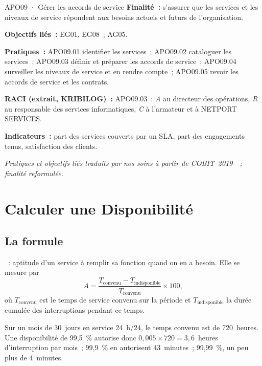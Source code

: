 \begin{boxobjet}{APO09 · Gérer les accords de service}
\textbf{Finalité~:} s'assurer que les services et les niveaux de service
répondent aux besoins actuels et futurs de l'organisation.

\textbf{Objectifs liés~:} EG01, EG08~; AG05.

\textbf{Pratiques~:} APO09.01 identifier les services~; APO09.02
cataloguer les services~; APO09.03 définir et préparer les accords de
service~; APO09.04 surveiller les niveaux de service et en rendre
compte~; APO09.05 revoir les accords de service et les contrats.

\textbf{RACI (extrait, KRIBILOG)~:} APO09.03~: \emph{A} au directeur des
opérations, \emph{R} au responsable des services informatiques, \emph{C}
à l'armateur et à NETPORT SERVICES.

\textbf{Indicateurs~:} part des services couverts par un SLA, part des
engagements tenus, satisfaction des clients.
\end{boxobjet}
{\small\itshape Pratiques et objectifs liés traduits par nos soins à partir
de COBIT~2019~\cite{isaca2018cobitobjectifs}~; finalité reformulée.}

\section{Calculer une Disponibilité}
\label{sec:c15-dispo}

\subsection{La formule}

\begin{boxdef}
~: aptitude d'un service à
remplir sa fonction quand on en a besoin. Elle se mesure par
\[
    A = \frac{T_{\text{convenu}} - T_{\text{indisponible}}}{T_{\text{convenu}}}
    \times 100,
\]
où $T_{\text{convenu}}$ est le temps de service convenu sur la période et
$T_{\text{indisponible}}$ la durée cumulée des interruptions pendant ce
temps.
\end{boxdef}

Sur un mois de 30~jours en service 24~h/24, le temps convenu est de
720~heures. Une disponibilité de 99,5~\% autorise donc $0{,}005 \times 720
= 3{,}6$~heures d'interruption par mois~; 99,9~\% en autorisent
43~minutes~; 99,99~\%, un peu plus de 4~minutes.

